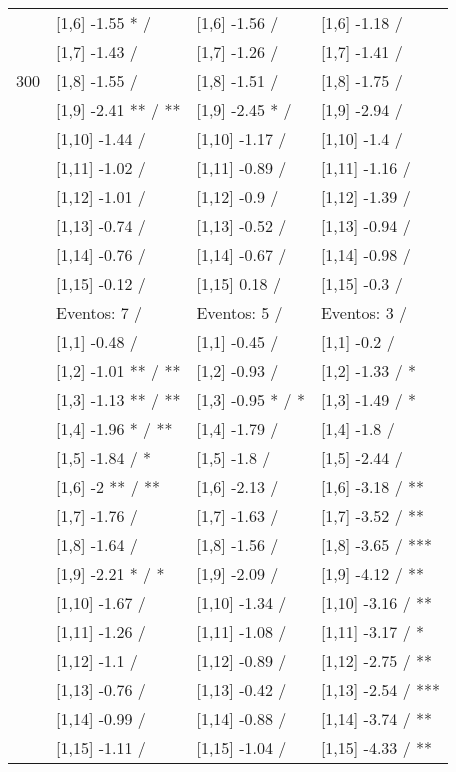 \begin{table}
\begin{tabular}[t]{llll}
 & {}[1,6] -1.55 * / & {}[1,6] -1.56  / & {}[1,6] -1.18  /\\
 & {}[1,7] -1.43  / & {}[1,7] -1.26  / & {}[1,7] -1.41  /\\
300 & {}[1,8] -1.55  / & {}[1,8] -1.51  / & {}[1,8] -1.75  /\\
\addlinespace
 & {}[1,9] -2.41 ** / ** & {}[1,9] -2.45 * / & {}[1,9] -2.94  /\\
 & {}[1,10] -1.44  / & {}[1,10] -1.17  / & {}[1,10] -1.4  /\\
 & {}[1,11] -1.02  / & {}[1,11] -0.89  / & {}[1,11] -1.16  /\\
 & {}[1,12] -1.01  / & {}[1,12] -0.9  / & {}[1,12] -1.39  /\\
 & {}[1,13] -0.74  / & {}[1,13] -0.52  / & {}[1,13] -0.94  /\\
\addlinespace
 & {}[1,14] -0.76  / & {}[1,14] -0.67  / & {}[1,14] -0.98  /\\
 & {}[1,15] -0.12  / & {}[1,15] 0.18  / & {}[1,15] -0.3  /\\
 & Eventos:  7 / & Eventos:  5 / & Eventos:  3 /\\
 & {}[1,1] -0.48  / & {}[1,1] -0.45  / & {}[1,1] -0.2  /\\
 & {}[1,2] -1.01 ** / ** & {}[1,2] -0.93  / & {}[1,2] -1.33  / *\\
\addlinespace
 & {}[1,3] -1.13 ** / ** & {}[1,3] -0.95 * / * & {}[1,3] -1.49  / *\\
 & {}[1,4] -1.96 * / ** & {}[1,4] -1.79  / & {}[1,4] -1.8  /\\
 & {}[1,5] -1.84  / * & {}[1,5] -1.8  / & {}[1,5] -2.44  /\\
 & {}[1,6] -2 ** / ** & {}[1,6] -2.13  / & {}[1,6] -3.18  / **\\
 & {}[1,7] -1.76  / & {}[1,7] -1.63  / & {}[1,7] -3.52  / **\\
\addlinespace
500 & {}[1,8] -1.64  / & {}[1,8] -1.56  / & {}[1,8] -3.65  / ***\\
 & {}[1,9] -2.21 * / * & {}[1,9] -2.09  / & {}[1,9] -4.12  / **\\
 & {}[1,10] -1.67  / & {}[1,10] -1.34  / & {}[1,10] -3.16  / **\\
 & {}[1,11] -1.26  / & {}[1,11] -1.08  / & {}[1,11] -3.17  / *\\
 & {}[1,12] -1.1  / & {}[1,12] -0.89  / & {}[1,12] -2.75  / **\\
\addlinespace
 & {}[1,13] -0.76  / & {}[1,13] -0.42  / & {}[1,13] -2.54  / ***\\
 & {}[1,14] -0.99  / & {}[1,14] -0.88  / & {}[1,14] -3.74  / **\\
 & {}[1,15] -1.11  / & {}[1,15] -1.04  / & {}[1,15] -4.33  / **\\
\bottomrule
\end{tabular}
\end{table}
